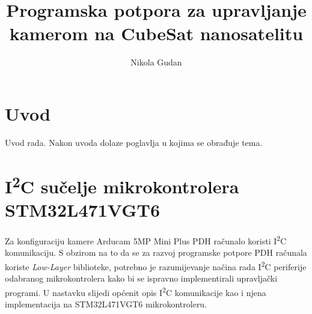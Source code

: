 \documentclass[times, utf8, zavrsni]{fer}
\begin{document}

\title{Programska potpora za upravljanje kamerom na CubeSat nanosatelitu}

\author{Nikola Gudan}

\maketitle

\izvornik

\zahvala{}

\tableofcontents

\chapter{Uvod}
Uvod rada. Nakon uvoda dolaze poglavlja u kojima se obrađuje tema.

\chapter{I\textsuperscript{2}C sučelje mikrokontrolera STM32L471VGT6}
Za konfiguraciju kamere Arducam 5MP Mini Plus  PDH računalo koristi I\textsuperscript{2}C komunikaciju. S obzirom na to da se za razvoj programske potpore PDH računala koriste \textit{Low-Layer} biblioteke, potrebno je razumijevanje načina rada I\textsuperscript{2}C periferije odabranog mikrokontrolera kako bi se ispravno implementirali upravljački programi. U nastavku slijedi općenit opis I\textsuperscript{2}C komunikacije kao i njena implementacija na STM32L471VGT6 mikrokontroleru.
\end{document}
